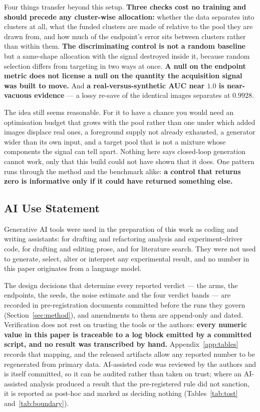 \documentclass{article} %
\begin{document}
Four things transfer beyond this setup. \textbf{Three checks cost no training and should precede any
cluster-wise allocation:} whether the data separates into clusters at all, what the funded clusters
are made of relative to the pool they are drawn from, and how much of the endpoint's error sits
between clusters rather than within them. \textbf{The discriminating control is not a random
baseline} but a same-shape allocation with the signal destroyed inside it, because random selection
differs from targeting in two ways at once. \textbf{A null on the endpoint metric does not license a
null on the quantity the acquisition signal was built to move.} And \textbf{a real-versus-synthetic
AUC near $1.0$ is near-vacuous evidence} --- a lossy re-save of the identical images separates at
$0.9928$.

The idea still seems reasonable. For it to have a chance you would need an optimisation budget that
grows with the pool rather than one under which added images displace real ones, a foreground supply
not already exhausted, a generator wider than its own input, and a target pool that is not a mixture
whose components the signal can tell apart. Nothing here says closed-loop generation cannot work,
only that this build could not have shown that it does. One pattern runs through the method and the
benchmark alike: \textbf{a control that returns zero is informative only if it could have returned
something else.}

\subsection*{AI Use Statement}

Generative AI tools were used in the preparation of this work as coding and writing assistants:
for drafting and refactoring analysis and experiment-driver code, for drafting and editing prose,
and for literature search. They were not used to generate, select, alter or interpret any
experimental result, and no number in this paper originates from a language model.

The design decisions that determine every reported verdict --- the arms, the endpoints, the seeds,
the noise estimate and the four verdict bands --- are recorded in pre-registration documents
committed before the runs they govern (Section~\ref{sec:method}), and amendments to them are
append-only and dated. Verification does not rest on trusting the tools or the authors:
\textbf{every numeric value in this paper is traceable to a log block emitted by a committed script,
and no result was transcribed by hand.} Appendix~\ref{app:tables} records that mapping, and the
released artifacts allow any reported number to be regenerated from primary data. AI-assisted code
was reviewed by the authors and is itself committed, so it can be audited rather than taken on
trust; where an AI-assisted analysis produced a result that the pre-registered rule did not
sanction, it is reported as post-hoc and marked as deciding nothing
(Tables~\ref{tab:tost} and~\ref{tab:boundary}).
\end{document}
